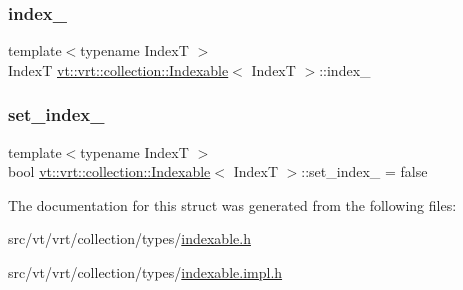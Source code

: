 \subsubsection{\texorpdfstring{index\+\_\+}{index\_}}
{\footnotesize\ttfamily template$<$typename IndexT $>$ \\
IndexT \hyperlink{structvt_1_1vrt_1_1collection_1_1_indexable}{vt\+::vrt\+::collection\+::\+Indexable}$<$ IndexT $>$\+::index\+\_\+\hspace{0.3cm}{\ttfamily [private]}}

\mbox{\label{structvt_1_1vrt_1_1collection_1_1_indexable_a946600975ab9eb4d1b122b6267bea35e}} 
\subsubsection{\texorpdfstring{set\+\_\+index\+\_\+}{set\_index\_}}
{\footnotesize\ttfamily template$<$typename IndexT $>$ \\
bool \hyperlink{structvt_1_1vrt_1_1collection_1_1_indexable}{vt\+::vrt\+::collection\+::\+Indexable}$<$ IndexT $>$\+::set\+\_\+index\+\_\+ = false\hspace{0.3cm}{\ttfamily [private]}}



The documentation for this struct was generated from the following files\+:\begin{DoxyCompactItemize}
\item 
src/vt/vrt/collection/types/\hyperlink{indexable_8h}{indexable.\+h}\item 
src/vt/vrt/collection/types/\hyperlink{indexable_8impl_8h}{indexable.\+impl.\+h}\end{DoxyCompactItemize}
